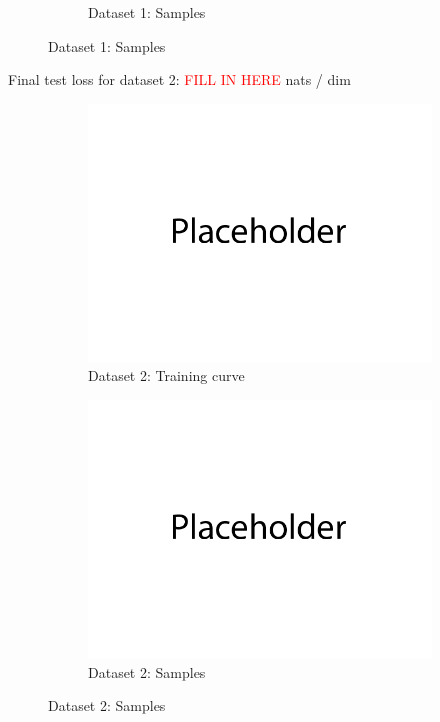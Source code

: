 \documentclass{article}
\begin{document}
\begin{enumerate}[(a)]
\begin{figure}[H]
\begin{subfigure}{0.45\textwidth}
        \caption{Dataset 1: Samples}
    \end{subfigure}
\end{figure}
Final test loss for dataset 2: \textcolor{red}{FILL IN HERE}  nats / dim
\begin{figure}[H]
    \centering
    \begin{subfigure}{0.45\textwidth}
        \centering
        \includegraphics[width=\textwidth]{figures/placeholder.png}
        \caption{Dataset 2: Training curve}
    \end{subfigure}
    \hspace{0.2in}
    \begin{subfigure}{0.45\textwidth}
        \centering
        \includegraphics[width=\textwidth]{figures/placeholder.png}
        \caption{Dataset 2: Samples}
    \end{subfigure}
\end{figure}

\end{enumerate}
\end{document}
